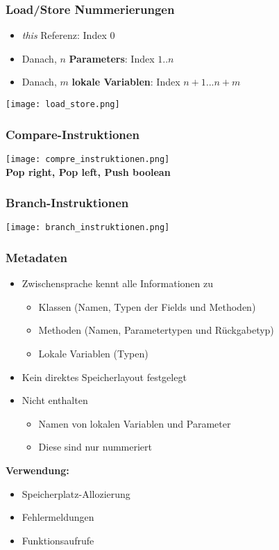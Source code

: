 \subsubsection{Load/Store Nummerierungen}
\begin{itemize}
    \item \textit{this} Referenz: Index 0
    \item Danach, $n$ \textbf{Parameters}: Index $1..n$
    \item Danach, $m$ \textbf{lokale Variablen}: Index $n+1...n+m$
\end{itemize}
\texttt{[image: load\_store.png]}

\subsubsection{Compare-Instruktionen}
\texttt{[image: compre\_instruktionen.png]}\\
\textbf{Pop right, Pop left, Push boolean}

\subsubsection{Branch-Instruktionen}
\texttt{[image: branch\_instruktionen.png]}\\

\subsubsection{Metadaten}
\begin{itemize}
    \item Zwischensprache kennt alle Informationen zu
    \begin{itemize}
        \item Klassen (Namen, Typen der Fields und Methoden)
        \item Methoden (Namen, Parametertypen und Rückgabetyp)
        \item Lokale Variablen (Typen)
    \end{itemize}
    \item Kein direktes Speicherlayout festgelegt
    \item Nicht enthalten
    \begin{itemize}
        \item Namen von lokalen Variablen und Parameter
        \item Diese sind nur nummeriert
    \end{itemize}
\end{itemize}
\textbf{Verwendung:}
\begin{itemize}
    \item Speicherplatz-Allozierung
    \item Fehlermeldungen
    \item Funktionsaufrufe
\end{itemize}

